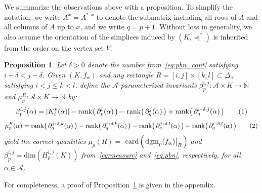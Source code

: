 \documentclass[10pt]{article}
\numberwithin{equation}{section}
\newcommand{\+}{%
	\raisebox{0.18ex}{\scaleobj{0.55}{+}}
}
\newcommand\restr[2]{{%
  \left.\kern-\nulldelimiterspace %
  #1 %
  \vphantom{\big|} %
  \right|_{#2} %
  }}
\newtheorem{proposition}{Proposition}
\theoremstyle{definition}
\theoremstyle{definition}
\newcommand\numberthis{\addtocounter{equation}{1}\tag{\theequation}}
\begin{document}
We summarize the observations above with a proposition. To simplify the notation, we write $A^{x} = A^{\ast,x}$ to denote the submatrix including all rows of $A$ and all columns of $A$ up to $x$, and we write $q = p + 1$. 
Without loss in generality, we also assume the orientation of the simplices induced by $(K, \preceq^\ast)$ is inherited from the order on the vertex set $V$. 
\begin{proposition}\label{prop:mu_betti_1}
	Let $\delta > 0$ denote the number from~\eqref{eq:pbn_cont} satisfying $i + \delta < j - \delta$. Given $(K, f_\alpha)$ and any rectangle $R = [i,j] \times [k,l] \subset \Delta_{+}$ satisfying $i < j \leq k < l$, define the $\mathcal{A}$-parameterized invariants $\beta_p^{i,j} : \mathcal{A} \times K \to \mathbb{N}$ and $\mu_p^{R} : \mathcal{A} \times K \to \mathbb{N}$ by: 
	\begin{align*}\label{eq:pbn_parameterized}
		\beta_p^{i,j}(\alpha) = \lvert K_i^{p}(\alpha) \rvert - \mathrm{rank}\big(\,\partial_{p}^{i}(\alpha)\,\big) - \mathrm{rank}\big(\,\partial_{q}^{j}(\alpha)\,\big) + \mathrm{rank}\big(\,\partial_{q}^{i \+ \delta, j}(\alpha)\,\big) \numberthis
	\end{align*}
	\vspace{-2.1em}
	\begin{align*}\label{eq:mu_parameterized}
	\mu_p^{R}(\alpha) = \mathrm{rank}\big(\, \partial_{q}^{j \+ \delta, k}(\alpha)\,\big) - \mathrm{rank}\big(\, \partial_{q}^{i \+ \delta, k}(\alpha)\,\big) - \mathrm{rank}\big(\, \partial_{q}^{j \+ \delta, l}(\alpha)\,\big) + \mathrm{rank}\big(\, \partial_{q}^{i \+ \delta, l}(\alpha)\,\big) \numberthis
	\end{align*}
	yield the correct quantities $\mu_p(R) = $
	$\mathrm{card} \left( \, \restr{\mathrm{dgm}_p(f_\alpha)}{R} \, \right)$ and 
	$\beta_p^{i,j} = \mathrm{dim}(H_p^{i,j}(K))$ from~\eqref{eq:measure} and~\eqref{eq:pbn}, respectively, for all $\alpha \in \mathcal{A}$.
\end{proposition}
\noindent For completeness, a proof of Proposition~\ref{prop:mu_betti_1} is given in the appendix. 

\end{document}
